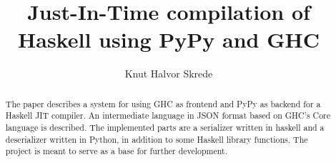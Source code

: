 \documentclass[12pt]{article}
\begin{document}
\title{Just-In-Time compilation of\\Haskell using PyPy and GHC}
\author{Knut Halvor Skrede}
\maketitle

\begin{abstract}
The paper describes a system for using GHC as frontend and PyPy as backend for a 
Haskell JIT compiler. An intermediate language in JSON format based on GHC's Core
language is described. The implemented parts are a serializer written in haskell and
a deserializer written in Python, in addition to some Haskell library functions.
The project is meant to serve as a base for further development. 
\end{abstract}

\clearpage

\tableofcontents

\clearpage

\setlength\LTleft{0pt}
\setlength\LTright{0pt}
























\end{document}

